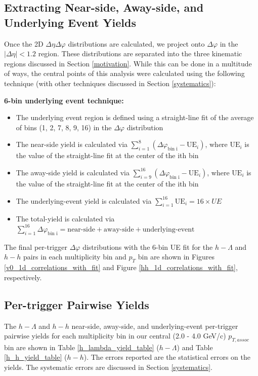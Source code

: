 \documentclass[ALICE,manyauthors]{ALICE_analysis_notes}
\begin{document}
\clearpage

\subsection{Extracting Near-side, Away-side, and Underlying Event Yields}
\label{yield_extraction}

Once the 2D $\Delta\eta\Delta\varphi$ distributions are calculated, we project onto $\Delta\varphi$ in the $|\Delta\eta| < 1.2$ region. These distributions are separated into the three kinematic regions discussed in Section \ref{motivation}. While this can be done in a multitude of ways, the central points of this analysis were calculated using the following technique (with other techniques discussed in Section \ref{systematics}):

\textbf{6-bin underlying event technique:}
\begin{itemize}
\item The underlying event region is defined using a straight-line fit of the average of bins (1, 2, 7, 8, 9, 16) in the $\Delta\varphi$ distribution
\item The near-side yield is calculated via $\sum_{i=1}^{8} (\Delta\varphi_\text{bin i} - \text{UE}_i)$, where $\text{UE}_i$ is the value of the straight-line fit at the center of the ith bin
\item The away-side yield is calculated via $\sum_{i=9}^{16} (\Delta\varphi_\text{bin i} - \text{UE}_i)$, where $\text{UE}_i$ is the value of the straight-line fit at the center of the ith bin
\item The underlying-event yield is calculated via $\sum_{i=1}^{16} \text{UE}_i = 16 \times UE$
\item The total-yield is calculated via $\sum_{i=1}^{16} \Delta\varphi_\text{bin i} = \text{near-side} + \text{away-side} + \text{underlying-event}$
\end{itemize}

The final per-trigger $\Delta\varphi$ distributions with the 6-bin UE fit for the $h-\Lambda$ and $h-h$ pairs in each multiplicity bin and $p_{T}$ bin are shown in Figures \ref{v0_1d_correlations_with_fit} and Figure \ref{hh_1d_correlations_with_fit}, respectively. 



\subsection{Per-trigger Pairwise Yields}

The $h-\Lambda$ and $h-h$ near-side, away-side, and underlying-event per-trigger pairwise yields for each multiplicity bin in our central (2.0 - 4.0 GeV/c) $p_{T, assoc}$ bin  are shown in Table \ref{h_lambda_yield_table} ($h-\Lambda$) and Table \ref{h_h_yield_table} ($h-h$). The errors reported are the statistical errors on the yields. The systematic errors are discussed in Section \ref{systematics}.
\end{document}
